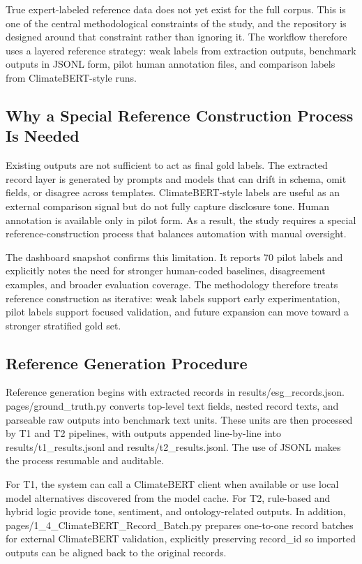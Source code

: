 \documentclass[english, online, cse, master]{dithesis}
\begin{document}
True expert-labeled reference data does not yet exist for the full corpus. This is one of the central methodological constraints of the study, and the repository is designed around that constraint rather than ignoring it. The workflow therefore uses a layered reference strategy: weak labels from extraction outputs, benchmark outputs in JSONL form, pilot human annotation files, and comparison labels from ClimateBERT-style runs.

\subsection{Why a Special Reference Construction Process Is Needed}

Existing outputs are not sufficient to act as final gold labels. The extracted record layer is generated by prompts and models that can drift in schema, omit fields, or disagree across templates. ClimateBERT-style labels are useful as an external comparison signal but do not fully capture disclosure tone. Human annotation is available only in pilot form. As a result, the study requires a special reference-construction process that balances automation with manual oversight.

The dashboard snapshot confirms this limitation. It reports 70 pilot labels and explicitly notes the need for stronger human-coded baselines, disagreement examples, and broader evaluation coverage. The methodology therefore treats reference construction as iterative: weak labels support early experimentation, pilot labels support focused validation, and future expansion can move toward a stronger stratified gold set.

\subsection{Reference Generation Procedure}

Reference generation begins with extracted records in results/esg\_records.json. pages/ground\_truth.py converts top-level text fields, nested record texts, and parseable raw outputs into benchmark text units. These units are then processed by T1 and T2 pipelines, with outputs appended line-by-line into results/t1\_results.jsonl and results/t2\_results.jsonl. The use of JSONL makes the process resumable and auditable.

For T1, the system can call a ClimateBERT client when available or use local model alternatives discovered from the model cache. For T2, rule-based and hybrid logic provide tone, sentiment, and ontology-related outputs. In addition, pages/1\_4\_ClimateBERT\_Record\_Batch.py prepares one-to-one record batches for external ClimateBERT validation, explicitly preserving record\_id so imported outputs can be aligned back to the original records.
\end{document}
